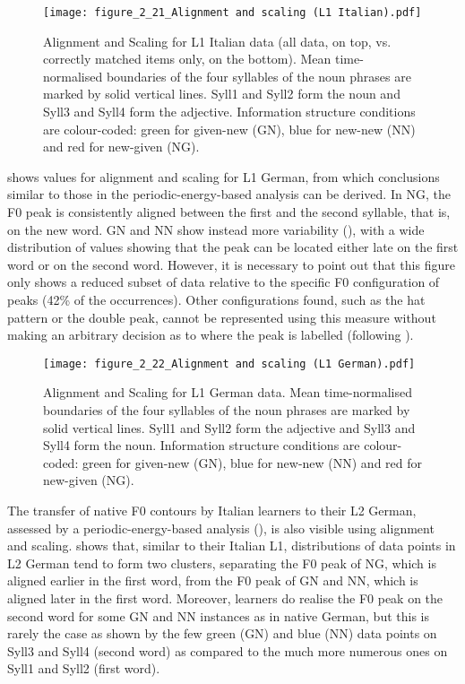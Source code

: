 \begin{figure}
\texttt{[image: figure\_2\_21\_Alignment and scaling (L1 Italian).pdf]}
\caption{Alignment and Scaling for L1 Italian data (all data, on top, vs. correctly matched items only, on the bottom). Mean time-normalised boundaries of the four syllables of the noun phrases are marked by solid vertical lines. Syll1 and Syll2 form the noun and Syll3 and Syll4 form the adjective. Information structure conditions are colour-coded: green for given-new (GN), blue for new-new (NN) and red for new-given (NG).}
\label{fig:2.21}
\end{figure}

 shows values for alignment and scaling for L1 German, from which conclusions similar to those in the periodic-energy-based analysis can be derived. In NG, the F0 peak is consistently aligned between the first and the second syllable, that is, on the new word. GN and NN show instead more variability (), with a wide distribution of values showing that the peak can be located either late on the first word or on the second word. However, it is necessary to point out that this figure only shows a reduced subset of data relative to the specific F0 configuration of peaks (42\% of the occurrences). Other configurations found, such as the hat pattern or the double peak, cannot be represented using this measure without making an arbitrary decision as to where the peak is labelled (following \citealt{Welby2004}).


\begin{figure}
\texttt{[image: figure\_2\_22\_Alignment and scaling (L1 German).pdf]}
\caption{Alignment and Scaling for L1 German data. Mean time-normalised boundaries of the four syllables of the noun phrases are marked by solid vertical lines. Syll1 and Syll2 form the adjective and Syll3 and Syll4 form the noun. Information structure conditions are colour-coded: green for given-new (GN), blue for new-new (NN) and red for new-given (NG).}
\label{fig:2.22}
\end{figure}

The transfer of native F0 contours by Italian learners to their L2 German, assessed by a periodic-energy-based analysis (), is also visible using alignment and scaling.  shows that, similar to their Italian L1, distributions of data points in L2 German tend to form two clusters, separating the F0 peak of NG, which is aligned earlier in the first word, from the F0 peak of GN and NN, which is aligned later in the first word. Moreover, learners do realise the F0 peak on the second word for some GN and NN instances as in native German, but this is rarely the case as shown by the few green (GN) and blue (NN) data points on Syll3 and Syll4 (second word) as compared to the much more numerous ones on Syll1 and Syll2 (first word).

